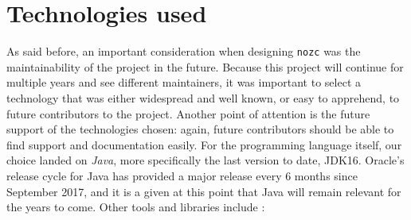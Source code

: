 \section{Technologies used}\label{sec:ch3-technologies}
As said before, an important consideration when designing \texttt{nozc} was the maintainability of the project in the future.
Because this project will continue for multiple years and see different maintainers, it was important to select a technology that was either widespread and well known, or easy to apprehend, to future contributors to the project.
Another point of attention is the future support of the technologies chosen: again, future contributors should be able to find support and documentation easily.
For the programming language itself, our choice landed on \textit{Java}, more specifically the last version to date, JDK16.
Oracle's release cycle for Java has provided a major release every 6 months since September 2017, and it is a given at this point that Java will remain relevant for the years to come.\newline
Other tools and libraries include :
